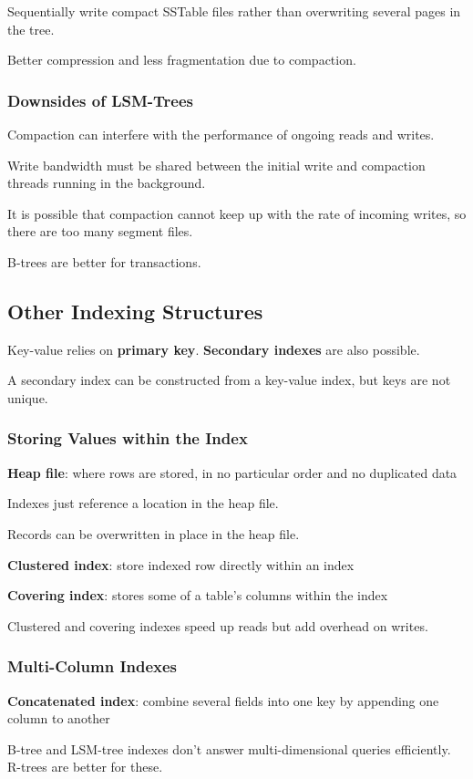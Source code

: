 \documentclass[11pt]{article}
\begin{document}
Sequentially write compact SSTable files rather than overwriting
several pages in the tree.

Better compression and less fragmentation due to compaction.
\subsubsection{Downsides of LSM-Trees}
\label{sec:org118ee98}
Compaction can interfere with the performance of ongoing reads
and writes.

Write bandwidth must be shared between the initial write and
compaction threads running in the background.

It is possible that compaction cannot keep up with the rate of
incoming writes, so there are too many segment files.

B-trees are better for transactions.
\subsection{Other Indexing Structures}
\label{sec:org0263037}
Key-value relies on \textbf{primary key}.
\textbf{Secondary indexes} are also possible.

A secondary index can be constructed from a key-value index, but
keys are not unique.
\subsubsection{Storing Values within the Index}
\label{sec:org6763982}
\textbf{Heap file}: where rows are stored, in no particular order
and no duplicated data

Indexes just reference a location in the heap file.

Records can be overwritten in place in the heap file.

\textbf{Clustered index}: store indexed row directly within an
index

\textbf{Covering index}: stores some of a table's columns within the
index

Clustered and covering indexes speed up reads but add overhead
on writes.
\subsubsection{Multi-Column Indexes}
\label{sec:org07f6351}
\textbf{Concatenated index}: combine several fields into one key by
appending one column to another

B-tree and LSM-tree indexes don't answer multi-dimensional queries
efficiently.
R-trees are better for these.
\end{document}
